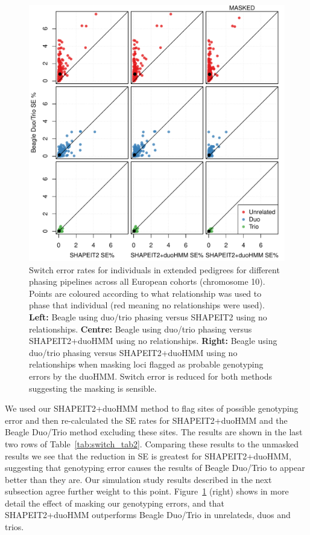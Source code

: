 \begin{figure}
 \begin{center} 
  \includegraphics[width=\textwidth]{chap4figs/ALL-trio-duo-switch-3x3-v2}
   \caption[Phasing accuracy in extended pedigrees]{Switch error rates for individuals in extended pedigrees for different phasing pipelines  across all European cohorts (chromosome 10).  Points are coloured according to what relationship was used to phase that individual (red meaning no relationships were used).  \textbf{Left:}  Beagle using duo/trio phasing versus SHAPEIT2 using no relationships.  \textbf{Centre:} Beagle using duo/trio phasing versus SHAPEIT2+duoHMM using no relationships.       \textbf{Right:}  Beagle using duo/trio phasing versus SHAPEIT2+duoHMM using no relationships when masking loci flagged as probable genotyping errors by the duoHMM. Switch error is reduced for both methods suggesting the masking is sensible.
     \label{fig:trio_fig}}
 \end{center} 
\end{figure}

We used our SHAPEIT2+duoHMM method to flag sites of possible genotyping error and then re-calculated the SE rates for SHAPEIT2+duoHMM and the Beagle Duo/Trio method excluding these sites. The results are shown in the last two rows of Table~\ref{tab:switch_tab2}. Comparing these results to the unmasked results we see that the reduction in SE is greatest for SHAPEIT2+duoHMM, suggesting that genotyping error causes the results of Beagle Duo/Trio to appear better than they are. Our simulation study results described in the next subsection agree further weight to this point. Figure~\ref{fig:trio_fig} (right) shows in more detail the effect of masking our genotyping errors, and that SHAPEIT2+duoHMM outperforms Beagle Duo/Trio in unrelateds, duos and trios.  


